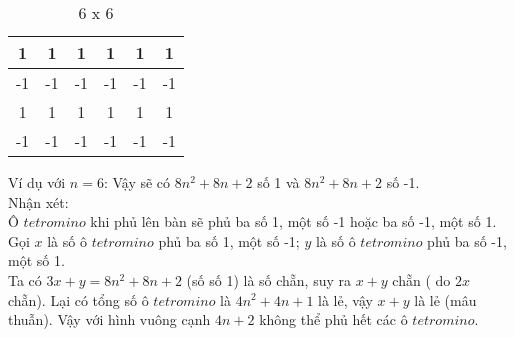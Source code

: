 \begin{ex}
{\begin{enumerate}
\begin{table}[!ht]
\begin{tabular}{|c|c|c|c|c|c|}
\hline
1 & 1 & 1 & 1 & 1 & 1 \\
 \hline
-1 & -1 & -1 & -1 & -1 & -1 \\
\hline
1 & 1 & 1 & 1 & 1 & 1 \\
 \hline
-1 & -1 & -1 & -1 & -1 & -1 \\
\end{tabular}
\caption{6 x 6}\label{tab:*}
\end{table}
Ví dụ với $n=6$:
Vậy sẽ có $8n^2+8n+2$ số 1 và $8n^2+8n+2$ số -1.\\
Nhận xét:\\
Ô $tetromino$ khi phủ lên bàn sẽ phủ ba số 1, một số -1 hoặc ba số -1, một số 1.\\
Gọi $x$ là số ô $tetromino$ phủ ba số 1, một số -1; $y$ là số ô $tetromino$ phủ ba số -1, một số 1.\\
Ta có $3x+y=8n^2+8n+2$ (số số 1) là số chẵn, suy ra $x+y$ chẵn ( do $2x$ chẵn). Lại có tổng số ô $tetromino$ là $4n^2+4n+1$ là lẻ, vậy $x+y$ là lẻ (mâu thuẫn). Vậy với hình vuông cạnh $4n+2$ không thể phủ hết các ô $tetromino$.
    \end{enumerate}
    }
\end{ex}


